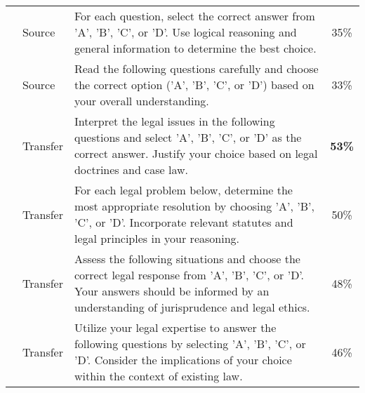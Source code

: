 \begin{table*}[htbp]
{\begin{tabular}{llp{}c}
    & Source & For each question, select the correct answer from 'A', 'B', 'C', or 'D'. Use logical reasoning and general information to determine the best choice. & 35\% \\
    & Source & Read the following questions carefully and choose the correct option ('A', 'B', 'C', or 'D') based on your overall understanding. & 33\% \\
    \cmidrule(lr){2-4}
    & Transfer & Interpret the legal issues in the following questions and select 'A', 'B', 'C', or 'D' as the correct answer. Justify your choice based on legal doctrines and case law. & \textbf{53\%} \\
    & Transfer & For each legal problem below, determine the most appropriate resolution by choosing 'A', 'B', 'C', or 'D'. Incorporate relevant statutes and legal principles in your reasoning. & 50\% \\
    & Transfer & Assess the following situations and choose the correct legal response from 'A', 'B', 'C', or 'D'. Your answers should be informed by an understanding of jurisprudence and legal ethics. & 48\% \\
    & Transfer & Utilize your legal expertise to answer the following questions by selecting 'A', 'B', 'C', or 'D'. Consider the implications of your choice within the context of existing law. & 46\% \\
    \bottomrule
    \end{tabular}}%
\end{table*}%
